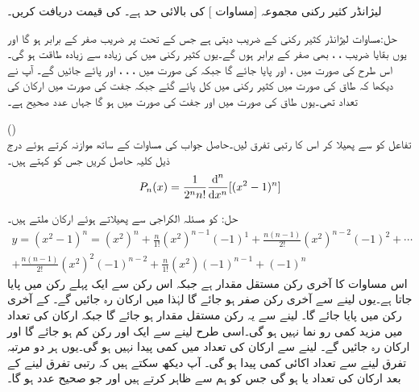 لیژانڈر کثیر رکنی مجموعہ [مساوات ] کی بالائی حد  ہے۔ کی قیمت دریافت کریں۔

حل:مساوات  لیژانڈر کثیر رکنی کے  ضریب  دیتی ہے جس کے تحت  پر  ضریب  صفر  کے برابر ہو گا اور یوں بقایا  ضریب  ، ،  بھی صفر کے برابر ہوں گے۔یوں کثیر رکنی میں  کی زیادہ سے زیادہ طاقت  ہو گی۔اس طرح  کی صورت میں ،  اور  پایا جائے گا جبکہ  کی صورت میں ، ، ،  اور  پائے جائیں گے۔ آپ نے دیکھا کہ طاق  کی صورت میں کثیر رکنی میں کل  پائے گئے جبکہ جفت  کی صورت میں ارکان کی تعداد  تھی۔یوں طاق  کی صورت میں   اور جفت  کی صورت میں  ہو گا جہاں  عدد صحیح ہے۔ 

\quad ()\\
تفاعل  کو  سے پھیلا کر اس کا  رتبی تفرق لیں۔حاصل جواب کی مساوات  کے ساتھ موازنہ کرتے ہوئے درج ذیل کلیہ حاصل کریں جس کو  کہتے ہیں۔
\begin{align}\label{مساوات_بیسل_روڈریگیس_مساوات}
P_n(x)=\frac{1}{2^n n!}\frac{\dif^{\,n}}{\dif x^n}[(x^2-1)^n]
\end{align}

حل: کو مسئلہ الکراجی سے پھیلاتے ہوئے  ارکان ملتے ہیں۔
\begin{multline}\label{مساوات_سوال_بیسل_الکرازی_الف}
y=(x^2-1)^n=(x^2)^n+\frac{n}{1!}(x^2)^{n-1}(-1)^1+\frac{n(n-1)}{2!}(x^2)^{n-2}(-1)^2+\cdots   \\
+\frac{n(n-1)}{2!}(x^2)^2(-1)^{n-2}+\frac{n}{1!}(x^2)(-1)^{n-1}+(-1)^n
\end{multline}
اس مساوات کا آخری رکن مستقل مقدار  ہے جبکہ اس رکن سے ایک پہلے  رکن میں  پایا جاتا ہے۔یوں  لینے سے آخری رکن صفر ہو جائے گا لہٰذا  میں  ارکان رہ جائیں گے۔ کے آخری رکن میں  پایا جائے گا۔ لینے سے یہ رکن مستقل مقدار ہو جائے گا جبکہ ارکان کی تعداد میں مزید کمی رو نما نہیں ہو گی۔اسی طرح  لینے سے ایک اور رکن کم ہو جائے گا اور  ارکان رہ جائیں گے۔ لینے سے ارکان کی تعداد میں کمی پیدا نہیں ہو گی۔یوں ہر دو مرتبہ تفرق لینے سے تعداد اکائی کمی پیدا ہو گی۔ آپ دیکھ سکتے ہیں کہ  رتبی تفرق  لینے کے بعد ارکان کی تعداد   یا  ہو گی جس کو ہم  سے ظاہر کرتے ہیں اور جو صحیح عدد ہو گا۔
 
